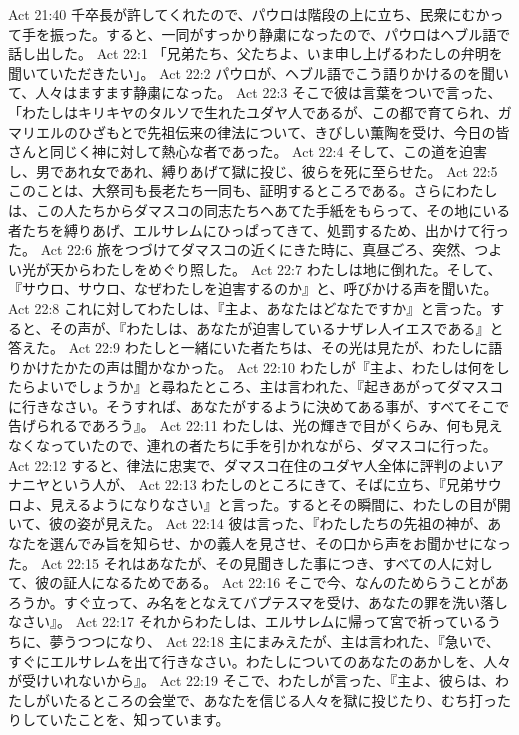 Act 21:40  千卒長が許してくれたので、パウロは階段の上に立ち、民衆にむかって手を振った。すると、一同がすっかり静粛になったので、パウロはヘブル語で話し出した。
Act 22:1  「兄弟たち、父たちよ、いま申し上げるわたしの弁明を聞いていただきたい」。
Act 22:2  パウロが、ヘブル語でこう語りかけるのを聞いて、人々はますます静粛になった。
Act 22:3  そこで彼は言葉をついで言った、「わたしはキリキヤのタルソで生れたユダヤ人であるが、この都で育てられ、ガマリエルのひざもとで先祖伝来の律法について、きびしい薫陶を受け、今日の皆さんと同じく神に対して熱心な者であった。
Act 22:4  そして、この道を迫害し、男であれ女であれ、縛りあげて獄に投じ、彼らを死に至らせた。
Act 22:5  このことは、大祭司も長老たち一同も、証明するところである。さらにわたしは、この人たちからダマスコの同志たちへあてた手紙をもらって、その地にいる者たちを縛りあげ、エルサレムにひっぱってきて、処罰するため、出かけて行った。
Act 22:6  旅をつづけてダマスコの近くにきた時に、真昼ごろ、突然、つよい光が天からわたしをめぐり照した。
Act 22:7  わたしは地に倒れた。そして、『サウロ、サウロ、なぜわたしを迫害するのか』と、呼びかける声を聞いた。
Act 22:8  これに対してわたしは、『主よ、あなたはどなたですか』と言った。すると、その声が、『わたしは、あなたが迫害しているナザレ人イエスである』と答えた。
Act 22:9  わたしと一緒にいた者たちは、その光は見たが、わたしに語りかけたかたの声は聞かなかった。
Act 22:10  わたしが『主よ、わたしは何をしたらよいでしょうか』と尋ねたところ、主は言われた、『起きあがってダマスコに行きなさい。そうすれば、あなたがするように決めてある事が、すべてそこで告げられるであろう』。
Act 22:11  わたしは、光の輝きで目がくらみ、何も見えなくなっていたので、連れの者たちに手を引かれながら、ダマスコに行った。
Act 22:12  すると、律法に忠実で、ダマスコ在住のユダヤ人全体に評判のよいアナニヤという人が、
Act 22:13  わたしのところにきて、そばに立ち、『兄弟サウロよ、見えるようになりなさい』と言った。するとその瞬間に、わたしの目が開いて、彼の姿が見えた。
Act 22:14  彼は言った、『わたしたちの先祖の神が、あなたを選んでみ旨を知らせ、かの義人を見させ、その口から声をお聞かせになった。
Act 22:15  それはあなたが、その見聞きした事につき、すべての人に対して、彼の証人になるためである。
Act 22:16  そこで今、なんのためらうことがあろうか。すぐ立って、み名をとなえてバプテスマを受け、あなたの罪を洗い落しなさい』。
Act 22:17  それからわたしは、エルサレムに帰って宮で祈っているうちに、夢うつつになり、
Act 22:18  主にまみえたが、主は言われた、『急いで、すぐにエルサレムを出て行きなさい。わたしについてのあなたのあかしを、人々が受けいれないから』。
Act 22:19  そこで、わたしが言った、『主よ、彼らは、わたしがいたるところの会堂で、あなたを信じる人々を獄に投じたり、むち打ったりしていたことを、知っています。
